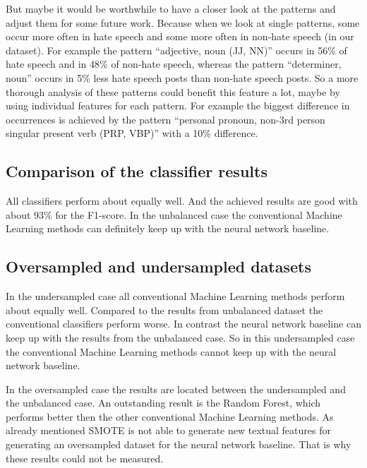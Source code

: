 But maybe it would be worthwhile to have a closer look at the patterns and adjust them for some future work. Because when we look at single patterns, some occur more often in hate speech and some more often in non-hate speech (in our dataset). For example the pattern \enquote{adjective, noun (JJ, NN)} occurs in 56\% of hate speech and in 48\% of non-hate speech, whereas the pattern \enquote{determiner, noun} occurs in 5\% less hate speech posts than non-hate speech posts. So a more thorough analysis of these patterns could benefit this feature a lot, maybe by using individual features for each pattern. For example the biggest difference in occurrences is achieved by the pattern \enquote{personal pronoun, non-3rd person singular present verb (PRP, VBP)} with a 10\% difference.

\subsection{Comparison of the classifier results}
\label{ch:experimentDc}

All classifiers perform about equally well. And the achieved results are good with about 93\% for the F1-score. In the unbalanced case the conventional Machine Learning methods can definitely keep up with the neural network baseline. 

\subsection{Oversampled and undersampled datasets}
\label{ch:experimentDd}

In the undersampled case all conventional Machine Learning methods perform about equally well. Compared to the results from unbalanced dataset the conventional classifiers perform worse. In contrast the neural network baseline can keep up with the results from the unbalanced case. So in this undersampled case the conventional Machine Learning methods cannot keep up with the neural network baseline.

In the oversampled case the results are located between the undersampled and the unbalanced case. An outstanding result is the Random Forest, which performs better then the other conventional Machine Learning methods. As already mentioned SMOTE is not able to generate new textual features for generating an oversampled dataset for the neural network baseline. That is why these results could not be measured.

